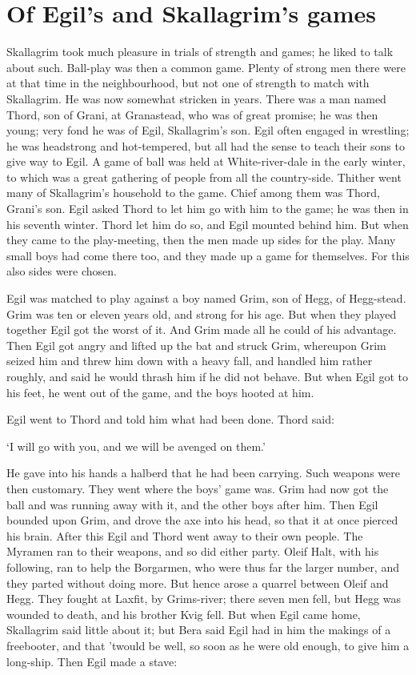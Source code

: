 \chapter{Of Egil's and Skallagrim's games}

Skallagrim took much pleasure in trials of strength and games; he liked to talk about such. Ball-play was then a common game. Plenty of strong men there were at that time in the neighbourhood, but not one of strength to match with Skallagrim. He was now somewhat stricken in years. There was a man named Thord, son of Grani, at Granastead, who was of great promise; he was then young; very fond he was of Egil, Skallagrim's son. Egil often engaged in wrestling; he was headstrong and hot-tempered, but all had the sense to teach their sons to give way to Egil. A game of ball was held at White-river-dale in the early winter, to which was a great gathering of people from all the country-side. Thither went many of Skallagrim's household to the game. Chief among them was Thord, Grani's son. Egil asked Thord to let him go with him to the game; he was then in his seventh winter. Thord let him do so, and Egil mounted behind him. But when they came to the play-meeting, then the men made up sides for the play. Many small boys had come there too, and they made up a game for themselves. For this also sides were chosen.

Egil was matched to play against a boy named Grim, son of Hegg, of Hegg-stead. Grim was ten or eleven years old, and strong for his age. But when they played together Egil got the worst of it. And Grim made all he could of his advantage. Then Egil got angry and lifted up the bat and struck Grim, whereupon Grim seized him and threw him down with a heavy fall, and handled him rather roughly, and said he would thrash him if he did not behave. But when Egil got to his feet, he went out of the game, and the boys hooted at him.

Egil went to Thord and told him what had been done. Thord said:

`I will go with you, and we will be avenged on them.'

He gave into his hands a halberd that he had been carrying. Such weapons were then customary. They went where the boys' game was. Grim had now got the ball and was running away with it, and the other boys after him. Then Egil bounded upon Grim, and drove the axe into his head, so that it at once pierced his brain. After this Egil and Thord went away to their own people. The Myramen ran to their weapons, and so did either party. Oleif Halt, with his following, ran to help the Borgarmen, who were thus far the larger number, and they parted without doing more. But hence arose a quarrel between Oleif and Hegg. They fought at Laxfit, by Grims-river; there seven men fell, but Hegg was wounded to death, and his brother Kvig fell. But when Egil came home, Skallagrim said little about it; but Bera said Egil had in him the makings of a freebooter, and that 'twould be well, so soon as he were old enough, to give him a long-ship. Then Egil made a stave:

